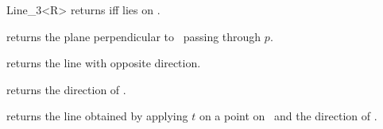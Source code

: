 \begin{ccRefClass} {Line_3<R>}
       {returns  iff  lies on \ccVar.}


       {returns the plane perpendicular to \ccVar\ passing through $p$.}

       {returns the line with opposite direction.}

       {returns the direction of \ccVar.}

       {returns the line obtained by applying $t$ on a point on \ccVar\ 
        and the direction of \ccVar.}

\end{ccRefClass} 
